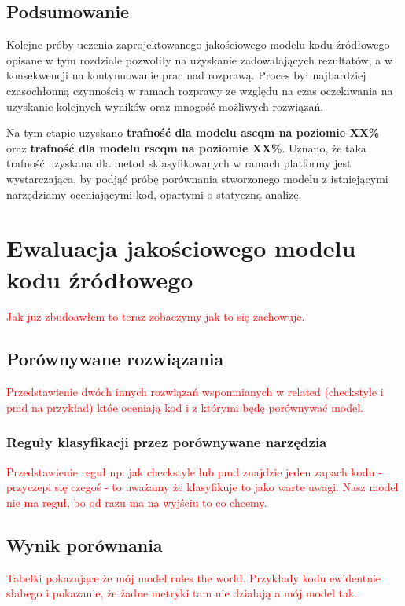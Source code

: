 \documentclass[12pt]{report}
\begin{document}
\section{Podsumowanie}

Kolejne próby uczenia zaprojektowanego jakościowego modelu kodu źródłowego opisane w tym rozdziale pozwoliły na uzyskanie zadowalających rezultatów, a w konsekwencji na kontynuowanie prac nad rozprawą. Proces był najbardziej czasochłonną czynnością w ramach rozprawy ze względu na czas oczekiwania na uzyskanie kolejnych wyników oraz mnogość możliwych rozwiązań.

Na tym etapie uzyskano \textbf{trafność dla modelu \gls{ascqm} na poziomie XX\%} oraz \textbf{trafność dla modelu \gls{rscqm} na poziomie XX\%}. Uznano, że taka trafność uzyskana dla metod sklasyfikowanych w ramach platformy jest wystarczająca, by podjąć próbę porównania stworzonego modelu z istniejącymi narzędziamy oceniającymi kod, opartymi o statyczną analizę.


\chapter{Ewaluacja jakościowego modelu kodu źródłowego}
\label{ch:eval}
\textcolor{red}{Jak już zbudoawłem to teraz zobaczymy jak to się zachowuje.}

\section{Porównywane rozwiązania}
\textcolor{red}{Przedstawienie dwóch innych rozwiązań wspomnianych w related (checkstyle i pmd na przykład) któe oceniają kod i z którymi będę porównywać model. }

\subsection{Reguły klasyfikacji przez porównywane narzędzia}
\textcolor{red}{Przedstawienie reguł np: jak checkstyle lub pmd znajdzie jeden zapach kodu - przyczepi się czegoś - to uważamy że klasyfikuje to jako warte uwagi. Nasz model nie ma reguł, bo od razu ma na wyjściu to co chcemy.}

\section{Wynik porównania}
\textcolor{red}{Tabelki pokazujące że mój model rules the world. Przykłady kodu ewidentnie słabego i pokazanie, że żadne metryki tam nie działają a mój model tak.}
\end{document}
